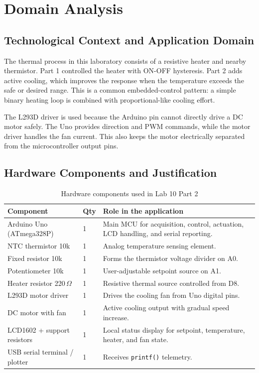 \documentclass[12pt]{article}
\begin{document}
\section{Domain Analysis}

\subsection{Technological Context and Application Domain}
\hspace{0.8cm} The thermal process in this laboratory consists of a resistive heater and nearby thermistor. Part 1 controlled the heater with ON-OFF hysteresis. Part 2 adds active cooling, which improves the response when the temperature exceeds the safe or desired range. This is a common embedded-control pattern: a simple binary heating loop is combined with proportional-like cooling effort.

\hspace{0.8cm} The L293D driver is used because the Arduino pin cannot directly drive a DC motor safely. The Uno provides direction and PWM commands, while the motor driver handles the fan current. This also keeps the motor electrically separated from the microcontroller output pins.

\subsection{Hardware Components and Justification}

\begin{table}[H]
\centering
\begin{tabular}{p{4.4cm} p{1.3cm} p{7.2cm}}
\toprule
\textbf{Component} & \textbf{Qty} & \textbf{Role in the application} \\
\midrule
Arduino Uno (ATmega328P) & 1 & Main MCU for acquisition, control, actuation, LCD handling, and serial reporting. \\
NTC thermistor 10k & 1 & Analog temperature sensing element. \\
Fixed resistor 10k & 1 & Forms the thermistor voltage divider on A0. \\
Potentiometer 10k & 1 & User-adjustable setpoint source on A1. \\
Heater resistor 220\,$\Omega$ & 1 & Resistive thermal source controlled from D8. \\
L293D motor driver & 1 & Drives the cooling fan from Uno digital pins. \\
DC motor with fan & 1 & Active cooling output with gradual speed increase. \\
LCD1602 + support resistors & 1 & Local status display for setpoint, temperature, heater, and fan state. \\
USB serial terminal / plotter & 1 & Receives \texttt{printf()} telemetry. \\
\bottomrule
\end{tabular}
\caption{Hardware components used in Lab 10 Part 2}
\label{tab:hardware}
\end{table}
\end{document}
